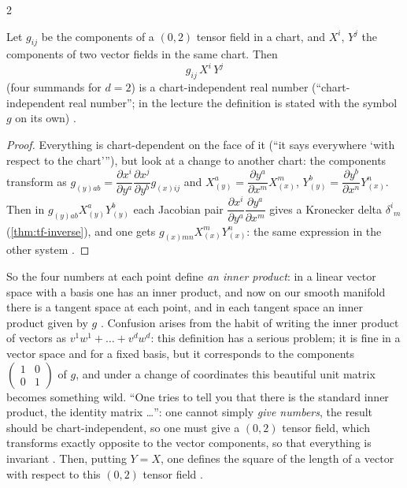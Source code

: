 \begin{paracol}{2}
\begin{definition}\label{def:sp-gXY}
Let $g_{ij}$ be the components of a $(0,2)$ tensor field in a chart, and $X^i$, $Y^j$ the components of two vector fields in the same chart. Then
\[
  g_{ij}\,X^i\,Y^j
\]
(four summands for $d=2$) is a chart-independent real number (``chart-independent real number''; in the lecture the definition is stated with the symbol
$g$ on its own) .
\end{definition}
\begin{proof}
Everything is chart-dependent on the face of it (``it says everywhere `with respect to the chart'''), but look at a change to another chart: the components
transform as $g_{(y)ab}=\dfrac{\partial x^i}{\partial y^a}\dfrac{\partial x^j}{\partial y^b}g_{(x)ij}$ and $X^a_{(y)}=\dfrac{\partial y^a}{\partial x^m}X^m_{(x)}$,
$Y^b_{(y)}=\dfrac{\partial y^b}{\partial x^n}Y^n_{(x)}$. Then in $g_{(y)ab}X^a_{(y)}Y^b_{(y)}$ each Jacobian pair $\dfrac{\partial x^i}{\partial y^a}\dfrac{\partial y^a}{\partial x^m}$ gives a Kronecker
delta $\delta^i{}_m$ (\cref{thm:tf-inverse}), and one gets $g_{(x)mn}X^m_{(x)}Y^n_{(x)}$: the same expression in the other system .
\end{proof}
So the four numbers at each point define \emph{an inner product}: in a linear vector space with a basis one has an inner product, and now on our smooth manifold
there is a tangent space at each point, and in each tangent space an inner product given by $g$ .
Confusion arises from the habit of writing the inner product of vectors as $v^1w^1+\dots+v^dw^d$: this definition has a serious problem; it is fine in a
vector space and for a fixed basis, but it corresponds to the components $(\begin{smallmatrix}1&0\\0&1\end{smallmatrix})$ of $g$, and under a change of coordinates this
beautiful unit matrix becomes something wild. ``One tries to tell you that there is the standard inner product, the identity matrix \dots'': one cannot simply \emph{give numbers}, the
result should be chart-independent, so one must give a $(0,2)$ tensor field, which transforms exactly opposite to the vector components, so that everything is invariant
. Then, putting $Y=X$, one defines the square of the length of a vector with respect to this $(0,2)$ tensor field .


\end{paracol}
